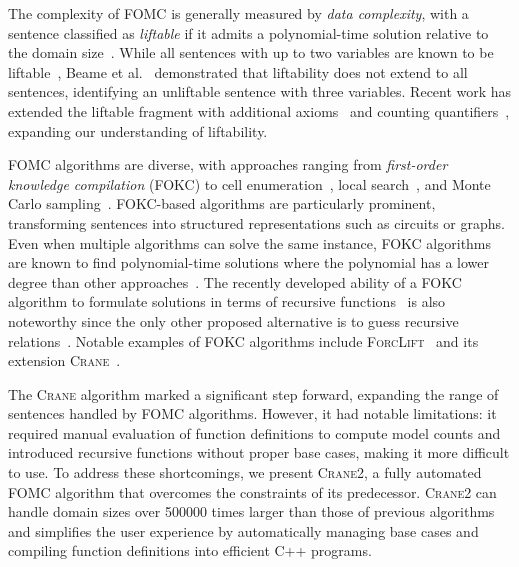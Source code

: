 \documentclass[a4paper,UKenglish,cleveref,autoref,table]{lipics-v2021}
\newcommand{\Cranetwo}{\textsc{Crane2}}
\begin{document}
The complexity of FOMC is generally measured by \emph{data complexity}, with a
sentence classified as \emph{liftable} if it admits a polynomial-time solution
relative to the domain size~\cite{DBLP:conf/starai/JaegerB12}. While all
sentences with up to two variables are known to be
liftable~\cite{DBLP:conf/nips/Broeck11,DBLP:conf/kr/BroeckMD14}, Beame et
al.~\cite{DBLP:conf/pods/BeameBGS15} demonstrated that liftability does not
extend to all sentences, identifying an unliftable sentence with three
variables. Recent work has extended the liftable fragment with additional
axioms~\cite{DBLP:conf/aaai/TothK23,DBLP:journals/ai/BremenK23} and counting
quantifiers~\cite{DBLP:journals/jair/Kuzelka21}, expanding our understanding of
liftability.

FOMC algorithms are diverse, with approaches ranging from \emph{first-order
  knowledge compilation} (FOKC) to cell
enumeration~\cite{DBLP:conf/uai/BremenK21}, local
search~\cite{DBLP:journals/pvldb/NiuRDS11}, and Monte Carlo
sampling~\cite{DBLP:journals/cacm/GogateD16}. FOKC-based algorithms are
particularly prominent, transforming sentences into structured representations
such as circuits or graphs. Even when multiple algorithms can solve the same
instance, FOKC algorithms are known to find polynomial-time solutions where the
polynomial has a lower degree than other
approaches~\cite{DBLP:conf/kr/DilkasB23}. The recently developed ability of a
FOKC algorithm to formulate solutions in terms of recursive
functions~\cite{DBLP:conf/kr/DilkasB23} is also noteworthy since the only other
proposed alternative is to guess recursive
relations~\cite{DBLP:conf/ilp/BarvinekB0ZK21}. Notable examples of FOKC
algorithms include \textsc{ForcLift}~\cite{DBLP:conf/ijcai/BroeckTMDR11} and its
extension \textsc{Crane}~\cite{DBLP:conf/kr/DilkasB23}.

The \textsc{Crane} algorithm marked a significant step forward, expanding the
range of sentences handled by FOMC algorithms. However, it had notable
limitations: it required manual evaluation of function definitions to compute
model counts and introduced recursive functions without proper base cases,
making it more difficult to use. To address these shortcomings, we present
\Cranetwo{}, a fully automated FOMC algorithm that overcomes the constraints of
its predecessor. \Cranetwo{} can handle domain sizes over \num{500000} times
larger than those of previous algorithms and simplifies the user experience by
automatically managing base cases and compiling function definitions into
efficient C++ programs.
\end{document}
